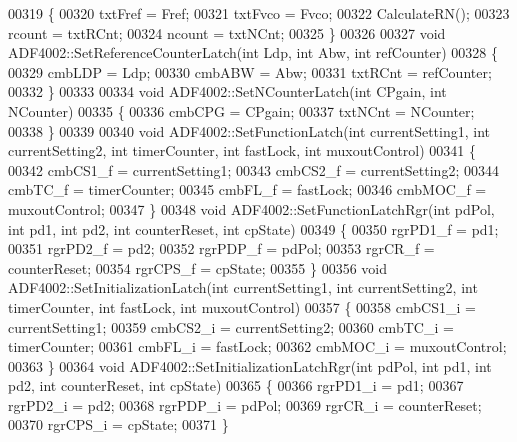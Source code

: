 \begin{DoxyCode}
00319 \{
00320     txtFref = Fref;
00321     txtFvco = Fvco;
00322     CalculateRN();
00323     rcount = txtRCnt;
00324     ncount = txtNCnt;
00325 \}
00326 
00327 \textcolor{keywordtype}{void} ADF4002::SetReferenceCounterLatch(\textcolor{keywordtype}{int} Ldp, \textcolor{keywordtype}{int} Abw, \textcolor{keywordtype}{int} refCounter)
00328 \{
00329     cmbLDP = Ldp;
00330     cmbABW = Abw;
00331     txtRCnt = refCounter;
00332 \}
00333 
00334 \textcolor{keywordtype}{void} ADF4002::SetNCounterLatch(\textcolor{keywordtype}{int} CPgain, \textcolor{keywordtype}{int} NCounter)
00335 \{
00336     cmbCPG = CPgain;
00337     txtNCnt = NCounter;
00338 \}
00339 
00340 \textcolor{keywordtype}{void} ADF4002::SetFunctionLatch(\textcolor{keywordtype}{int} currentSetting1, \textcolor{keywordtype}{int} currentSetting2, \textcolor{keywordtype}{int} timerCounter, \textcolor{keywordtype}{int} fastLock, \textcolor{keywordtype}{
      int} muxoutControl)
00341 \{
00342     cmbCS1_f = currentSetting1;
00343     cmbCS2_f = currentSetting2;
00344     cmbTC_f = timerCounter;
00345     cmbFL_f = fastLock;
00346     cmbMOC_f = muxoutControl;
00347 \}
00348 \textcolor{keywordtype}{void} ADF4002::SetFunctionLatchRgr(\textcolor{keywordtype}{int} pdPol, \textcolor{keywordtype}{int} pd1, \textcolor{keywordtype}{int} pd2, \textcolor{keywordtype}{int} counterReset, \textcolor{keywordtype}{int} cpState)
00349 \{
00350     rgrPD1_f = pd1;
00351     rgrPD2_f = pd2;
00352     rgrPDP_f = pdPol;
00353     rgrCR_f = counterReset;
00354     rgrCPS_f = cpState;
00355 \}
00356 \textcolor{keywordtype}{void} ADF4002::SetInitializationLatch(\textcolor{keywordtype}{int} currentSetting1, \textcolor{keywordtype}{int} currentSetting2, \textcolor{keywordtype}{int} timerCounter, \textcolor{keywordtype}{int} 
      fastLock, \textcolor{keywordtype}{int} muxoutControl)
00357 \{
00358     cmbCS1_i = currentSetting1;
00359     cmbCS2_i = currentSetting2;
00360     cmbTC_i = timerCounter;
00361     cmbFL_i = fastLock;
00362     cmbMOC_i = muxoutControl;
00363 \}
00364 \textcolor{keywordtype}{void} ADF4002::SetInitializationLatchRgr(\textcolor{keywordtype}{int} pdPol, \textcolor{keywordtype}{int} pd1, \textcolor{keywordtype}{int} pd2, \textcolor{keywordtype}{int} counterReset, \textcolor{keywordtype}{int} cpState)
00365 \{
00366     rgrPD1_i = pd1;
00367     rgrPD2_i = pd2;
00368     rgrPDP_i = pdPol;
00369     rgrCR_i = counterReset;
00370     rgrCPS_i = cpState;
00371 \}
\end{DoxyCode}
